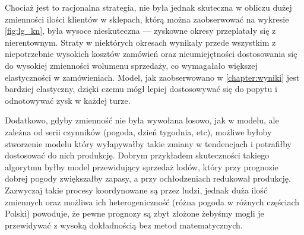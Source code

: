 \documentclass[polish, twoside, 12pt, a4paper]{article}
\theoremstyle{definition}
\theoremstyle{plain}
\theoremstyle{remark}
\begin{document}
Chociaż jest to racjonalna strategia, nie była jednak skuteczna w obliczu dużej zmienności ilości klientów w sklepach, którą można zaobserwować na wykresie \ref{fig:lg_kn}, była wysoce nieskuteczna --- zyskowne okresy przeplatały się z nierentownym. Straty w niektórych okresach wynikały przede wszystkim z niepotrzebnie wysokich kosztów zamówień oraz nieumiejętności dostosowania się do wysokiej zmienności wolumenu sprzedaży, co wymagałało większej elastyczności w zamówieniach. Model, jak zaobserwowano w \ref{chapter:wyniki} jest bardziej elastyczny, dzięki czemu mógł lepiej dostosowywać się do popytu i odnotowywać zysk w każdej turze. 

Dodatkowo, gdyby zmienność nie była wywołana losowo, jak w modelu, ale zależna od serii czynników (pogoda, dzień tygodnia, etc), możliwe byłoby stworzenie modelu który wyłapywałby takie zmiany w tendencjach i potrafiłby dostosować do nich produkcję. Dobrym przykładem skuteczności takiego algorytmu byłby model przewidujący sprzedaż lodów, który przy prognozie dobrej pogody zwiększałby zapasy, a przy ochłodzeniach redukował produkcję. Zazwyczaj takie procesy koordynowane są przez ludzi, jednak duża ilość zmiennych oraz możliwa ich heterogeniczność (różna pogoda w różnych częściach Polski) powoduje, że pewne prognozy są zbyt złożone żebyśmy mogli je przewidywać z wysoką dokładnością bez metod matematycznych. 
\end{document}

